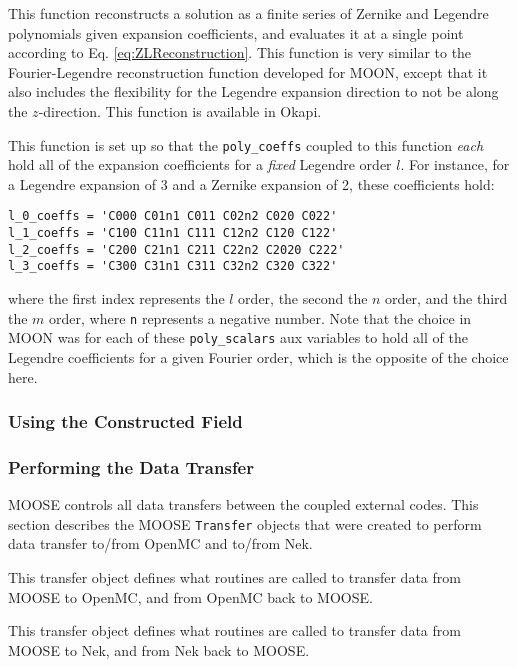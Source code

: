 \documentclass[10pt]{article}
\newcounter{subsubsubsection}[subsubsection]
\numberwithin{equation}{section} %
\begin{document}
This function reconstructs a solution as a finite series of Zernike and Legendre polynomials given expansion coefficients, and evaluates it at a single point according to Eq. \eqref{eq:ZLReconstruction}. This function is very similar to the Fourier-Legendre reconstruction function developed for MOON, except that it also includes the flexibility for the Legendre expansion direction to not be along the \(z\)-direction. This function is available in Okapi.

This function is set up so that the {\tt poly\_coeffs} coupled to this function {\it each} hold all of the expansion coefficients for a {\it fixed} Legendre order \(l\). For instance, for a Legendre expansion of 3 and a Zernike expansion of 2, these coefficients hold:

\begin{lstlisting}
l_0_coeffs = 'C000 C01n1 C011 C02n2 C020 C022'
l_1_coeffs = 'C100 C11n1 C111 C12n2 C120 C122'
l_2_coeffs = 'C200 C21n1 C211 C22n2 C2020 C222'
l_3_coeffs = 'C300 C31n1 C311 C32n2 C320 C322'
\end{lstlisting}

where the first index represents the \(l\) order, the second the \(n\) order, and the third the \(m\) order, where {\tt n} represents a negative number. Note that the choice in MOON was for each of these {\tt poly\_scalars} aux variables to hold all of the Legendre coefficients for a given Fourier order, which is the opposite of the choice here. 

\subsubsection{Using the Constructed Field}

\subsubsection{Performing the Data Transfer}
MOOSE controls all data transfers between the coupled external codes. This section describes the MOOSE {\tt Transfer} objects that were created to perform data transfer to/from OpenMC and to/from Nek.

This transfer object defines what routines are called to transfer data from MOOSE to OpenMC, and from OpenMC back to MOOSE.

This transfer object defines what routines are called to transfer data from MOOSE to Nek, and from Nek back to MOOSE.
\end{document}
